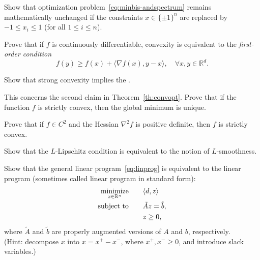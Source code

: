 \begin{myexercise}\label{ex:maxcutcontinuousoptimizationproblem}
Show that optimization problem~\eqref{eq:minbis-andspectrum} remains mathematically unchanged if the constraints $x\in\{\pm1\}^n$ are replaced by $-1\leq x_i\leq 1$ (for all $1\leq i\leq n$).
\end{myexercise}

\begin{myexercise}
Prove that if $f$ is continuously differentiable, convexity is equivalent to the {\em first-order condition} 
\begin{equation*}
 \label{def:geomconvex}
f(y) \ge f(x) +  \langle \nabla f(x), y - x\rangle, \quad \forall x,y \in \mathbb{R}^d.
\end{equation*}    
\end{myexercise}


\begin{myexercise}
Show that strong convexity implies the \PLC. 
\end{myexercise}

\begin{myexercise} \label{eq:ex_uniqueness}
This concerns the second claim in Theorem~\ref{th:convopt}.
Prove that if the function $f$ is strictly convex, then the global minimum is unique.    
\end{myexercise}

\begin{myexercise}
Prove that if  $f\in C^2$ and the Hessian $\nabla^2 f$ is positive definite, then $f$ is strictly convex.
\end{myexercise}



\begin{myexercise}
Show that the $L$-Lipschitz condition is equivalent to the notion of $L$-smoothness.    
\end{myexercise}

\begin{myexercise}
Show that the general linear program~\eqref{eq:linprog} is equivalent to the linear program (sometimes called linear program in standard form):
\begin{align*}
\begin{split}
\underset{x\in\mathbb{R}^n}{\text{minimize}} & \qquad  \langle d, z \rangle  \\
 \text{subject to} & \qquad \tilde{A}z = \tilde{b}, \\
 & \qquad z \ge 0,
\end{split}
\end{align*}
where $\tilde{A}$ and $\tilde{b}$ are properly augmented versions of $A$ and $b$, respectively.\\
(Hint: decompose $x$ into $x=x^{+} - x^{-}$, where $x^{+}, x^{-} \ge 0$, and introduce slack variables.)

\end{myexercise}


